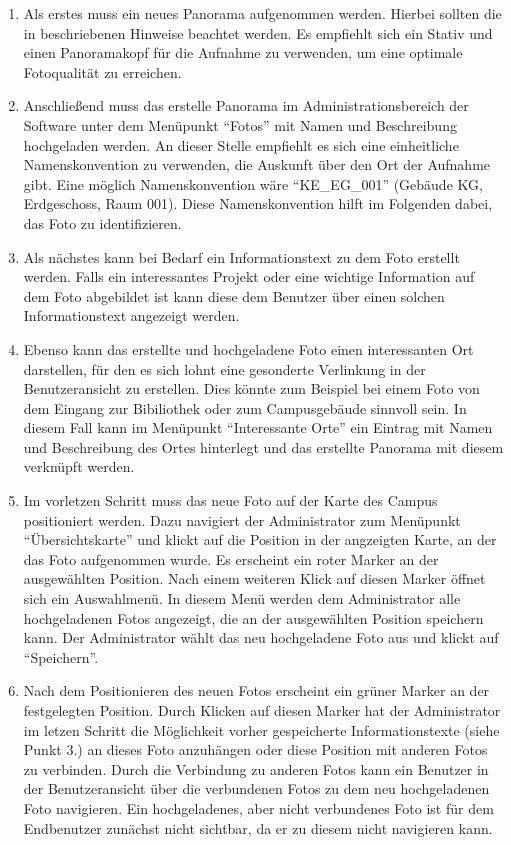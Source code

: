 \begin{enumerate}
  \item Als erstes muss ein neues Panorama aufgenommen werden. Hierbei
  sollten die in  beschriebenen Hinweise beachtet
  werden. Es empfiehlt sich ein Stativ und einen Panoramakopf für die Aufnahme
  zu verwenden, um eine optimale Fotoqualität zu erreichen.
  \item Anschließend muss das erstelle Panorama im Administrationsbereich
  der Software unter dem Menüpunkt "`Fotos"' mit Namen und Beschreibung
  hochgeladen werden. An dieser Stelle empfiehlt es sich eine einheitliche
  Namenskonvention zu verwenden, die Auskunft über den Ort der Aufnahme gibt.
  Eine möglich Namenskonvention wäre "`KE\_EG\_001"' (Gebäude KG, Erdgeschoss,
  Raum 001). Diese Namenskonvention hilft im Folgenden dabei, das Foto zu
  identifizieren.
  \item Als nächstes kann bei Bedarf ein Informationstext zu dem Foto
  erstellt werden. Falls ein interessantes Projekt oder eine wichtige
  Information auf dem Foto abgebildet ist kann diese dem Benutzer über einen
  solchen Informationstext angezeigt werden.
  \item Ebenso kann das erstellte und hochgeladene Foto einen interessanten
  Ort darstellen, für den es sich lohnt eine gesonderte Verlinkung in der
  Benutzeransicht zu erstellen. Dies könnte zum Beispiel bei einem Foto von dem
  Eingang zur Bibiliothek oder zum Campusgebäude sinnvoll sein. In diesem Fall
  kann im Menüpunkt "`Interessante Orte"' ein Eintrag mit Namen und
  Beschreibung des Ortes hinterlegt und das erstellte Panorama mit diesem
  verknüpft werden.
  \item Im vorletzen Schritt muss das neue Foto auf der Karte des Campus
  positioniert werden. Dazu navigiert der Administrator zum Menüpunkt
  "`Übersichtskarte"' und klickt auf die Position in der angzeigten Karte, an
  der das Foto aufgenommen wurde. Es erscheint ein roter Marker an der
  ausgewählten Position. Nach einem weiteren Klick auf diesen Marker öffnet sich
  ein Auswahlmenü. In diesem Menü werden dem Administrator alle hochgeladenen
  Fotos angezeigt, die an der ausgewählten Position speichern kann. Der
  Administrator wählt das neu hochgeladene Foto aus und klickt auf
  "`Speichern"'.
  \item Nach dem Positionieren des neuen Fotos erscheint ein grüner Marker
  an der festgelegten Position. Durch Klicken auf diesen Marker hat der
  Administrator im letzen Schritt die Möglichkeit vorher gespeicherte
  Informationstexte (siehe Punkt 3.) an dieses Foto anzuhängen oder diese
  Position mit anderen Fotos zu verbinden. Durch die Verbindung zu anderen Fotos
  kann ein Benutzer in der Benutzeransicht über die verbundenen Fotos zu dem neu
  hochgeladenen Foto navigieren. Ein hochgeladenes, aber nicht verbundenes  
  Foto ist für dem Endbenutzer zunächst nicht sichtbar, da er zu diesem nicht
  navigieren kann.
\end{enumerate}